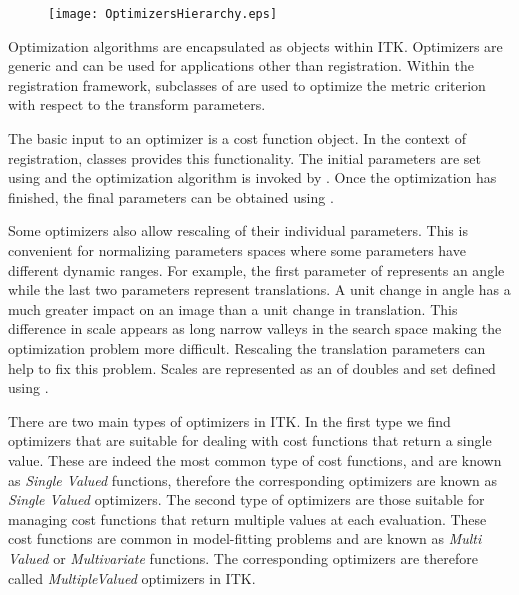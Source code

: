 


\begin{figure}
\center
\texttt{[image: OptimizersHierarchy.eps]}
\label{fig:OptimizersHierarchy}
\end{figure}

Optimization algorithms are encapsulated as  objects
within ITK. Optimizers are generic and can be used for applications other than
registration.  Within the registration framework, subclasses of
 are used to optimize the metric
criterion with respect to the transform parameters.


The basic input to an optimizer is a cost function object. In the context
of registration,  classes provides this functionality.
The initial parameters are set using  and
the optimization algorithm is invoked by .
Once the optimization has finished, the final parameters can be obtained
using .

Some optimizers also allow rescaling of their individual parameters. This is
convenient for normalizing parameters spaces where some parameters have
different dynamic ranges. For example, the first parameter of
 represents an angle while the last two parameters
represent translations. A unit change in angle has a much greater impact on an
image than a unit change in translation. This difference in scale appears as
long narrow valleys in the search space making the optimization problem more
difficult. Rescaling the translation parameters can help to fix this problem.
Scales are represented as an  of doubles and set defined using
.

There are two main types of optimizers in ITK. In the first type we find
optimizers that are suitable for dealing with cost functions that return a
single value. These are indeed the most common type of cost functions, and are
known as \emph{Single Valued} functions, therefore the corresponding optimizers
are known as \emph{Single Valued} optimizers. The second type of optimizers are
those suitable for managing cost functions that return multiple values at each
evaluation. These cost functions are common in model-fitting problems and are
known as \emph{Multi Valued} or \emph{Multivariate} functions.  The
corresponding optimizers are therefore called \emph{MultipleValued} optimizers
in ITK.

